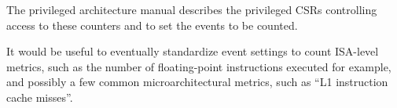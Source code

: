 \begin{commentary}
  The privileged architecture manual describes the privileged CSRs
  controlling access to these counters and to set the events to be
  counted.

  It would be useful to eventually standardize event settings to count
  ISA-level metrics, such as the number of floating-point instructions
  executed for example, and possibly a few common microarchitectural
  metrics, such as ``L1 instruction cache misses''.
\end{commentary}
